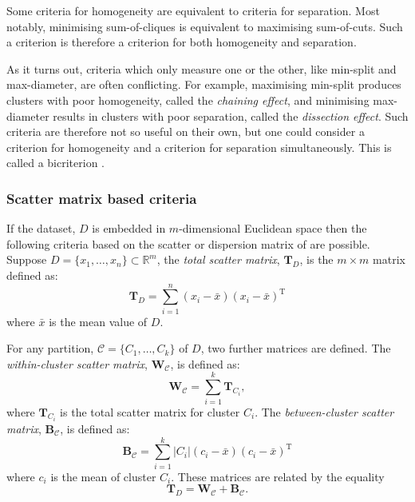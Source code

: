 \documentclass[a4paper]{report}
\newcommand{\dset}{D}
\newcommand{\clus}{\mathcal{C}}
\begin{document}
Some criteria for homogeneity are equivalent to criteria for separation.  Most
notably, minimising sum-of-cliques is equivalent to maximising sum-of-cuts.
Such a criterion is therefore a criterion for both homogeneity and separation.

As it turns out, criteria which only measure one or the other, like min-split
and max-diameter, are often conflicting.  For example, maximising min-split
produces clusters with poor homogeneity, called the \textit{chaining effect},
and minimising max-diameter results in clusters with poor separation, called
the \textit{dissection effect}.  Such criteria are therefore not so useful on
their own, but one could consider a criterion for homogeneity and a criterion
for separation simultaneously.  This is called a bicriterion
\citep{delattre1980bicriterion}.

\subsubsection{Scatter matrix based criteria}
\label{sec:scatter-matrix-based}

If the dataset, $\dset$ is embedded in $m$-dimensional Euclidean space then
the following criteria based on the scatter or dispersion matrix of
\citet{wilks60} are possible.  Suppose $\dset = \{x_1,\dotsc,x_n\} \subset
\mathbb{R}^m$, the \textit{total scatter matrix}, $\mathbf{T}_{\dset}$, is the
$m \times m$ matrix defined as:
\begin{equation*}
  \mathbf{T}_{\dset} = \sum_{i=1}^{n} (x_i - \bar{x})(x_i - \bar{x})^{\mathrm{T}}
\end{equation*}
where $\bar{x}$ is the mean value of $\dset$.

For any partition, $\clus = \{C_1,\dotsc,C_k\}$ of $\dset$, two further
matrices are defined.  The \textit{within-cluster scatter matrix},
$\mathbf{W}_{\clus}$, is defined as:
\begin{equation*}
\mathbf{W}_{\clus} = \sum_{i=1}^{k} \mathbf{T}_{C_i},
\end{equation*}
where $\mathbf{T}_{C_i}$ is the total scatter matrix for cluster $C_i$.  The
\textit{between-cluster scatter matrix}, $\mathbf{B}_{\clus}$, is defined as:
\begin{equation*}
  \mathbf{B}_{\clus} =
  \sum_{i=1}^{k} |C_i| (c_i - \bar{x}) (c_i - \bar{x})^{\mathrm{T}}
\end{equation*}
where $c_i$ is the mean of cluster $C_i$.  These matrices are related by the
equality
\begin{equation*}
  \mathbf{T}_{\dset} = \mathbf{W}_{\clus} + \mathbf{B}_{\clus}.
\end{equation*}
\end{document}
